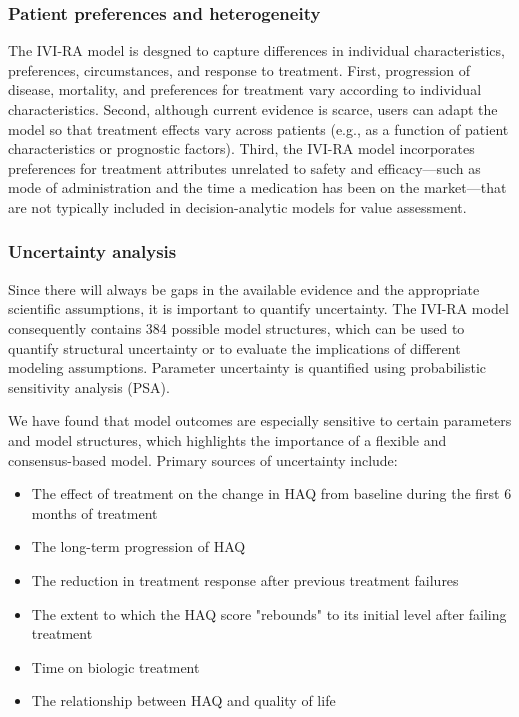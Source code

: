 \documentclass[11pt,final,fleqn]{article}
\theoremstyle{plain}
\begin{document}
\subsubsection*{Patient preferences and heterogeneity}
The IVI-RA model is desgned to capture differences in individual characteristics, preferences, circumstances, and response to treatment. First, progression of disease, mortality, and preferences for treatment vary according to individual characteristics. Second, although current evidence is scarce, users can adapt the model so that treatment effects vary across patients (e.g., as a function of patient characteristics or prognostic factors). Third, the IVI-RA model incorporates preferences for treatment attributes unrelated to safety and efficacy---such as mode of administration and the time a medication has been on the market---that are not typically included in decision-analytic models for value assessment.  

\subsubsection*{Uncertainty analysis}
Since there will always be gaps in the available evidence and the appropriate scientific assumptions, it is important to quantify uncertainty. The IVI-RA model consequently contains 384 possible model structures, which can be used to quantify structural uncertainty or to evaluate the implications of different modeling assumptions. Parameter uncertainty is quantified using probabilistic sensitivity analysis (PSA). 

We have found that model outcomes are especially sensitive to certain parameters and model structures, which highlights the importance of a flexible and consensus-based model. Primary sources of uncertainty include:

\begin{itemize}
\item The effect of treatment on the change in HAQ from baseline during the first 6 months of treatment
\item The long-term progression of HAQ
\item The reduction in treatment response after previous treatment failures
\item The extent to which the HAQ score "rebounds" to its initial level after failing treatment
\item Time on biologic treatment
\item The relationship between HAQ and quality of life
\end{itemize}
\end{document}

